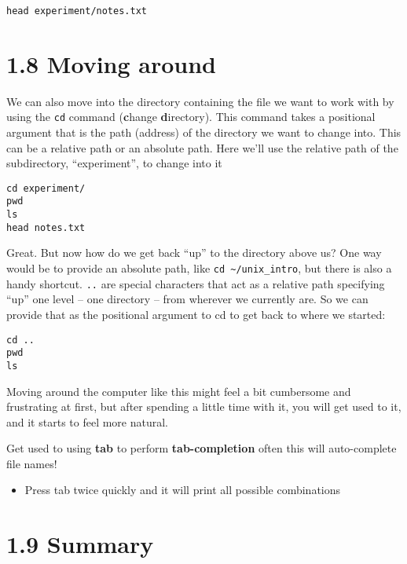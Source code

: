 \documentclass[
]{book}
\providecommand{\tightlist}{%
  \setlength{\itemsep}{0pt}\setlength{\parskip}{0pt}}
\begin{document}
\begin{verbatim}
head experiment/notes.txt
\end{verbatim}

\hypertarget{moving-around}{%
\section{1.8 Moving around}\label{moving-around}}

We can also move into the directory containing the file we want to work with by using the \texttt{cd} command (\textbf{c}hange \textbf{d}irectory). This command takes a positional argument that is the path (address) of the directory we want to change into. This can be a relative path or an absolute path. Here we'll use the relative path of the subdirectory, ``experiment'', to change into it

\begin{verbatim}
cd experiment/
pwd
ls
head notes.txt
\end{verbatim}

Great. But now how do we get back ``up'' to the directory above us? One way would be to provide an absolute path, like \texttt{cd\ \textasciitilde{}/unix\_intro}, but there is also a handy shortcut. \texttt{..} are special characters that act as a relative path specifying ``up'' one level -- one directory -- from wherever we currently are. So we can provide that as the positional argument to cd to get back to where we started:

\begin{verbatim}
cd ..
pwd
ls
\end{verbatim}

Moving around the computer like this might feel a bit cumbersome and frustrating at first, but after spending a little time with it, you will get used to it, and it starts to feel more natural.

Get used to using \textbf{tab} to perform \textbf{tab-completion} often this will auto-complete file names!

\begin{itemize}
\tightlist
\item
  Press tab twice quickly and it will print all possible combinations
\end{itemize}

\hypertarget{summary}{%
\section{1.9 Summary}\label{summary}}
\end{document}
